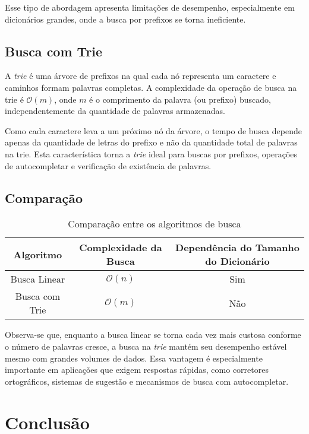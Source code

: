 \documentclass[12pt]{article}
\begin{document}
Esse tipo de abordagem apresenta limitações de desempenho, especialmente em dicionários grandes, onde a busca por prefixos se torna ineficiente.

\subsection{Busca com Trie}

A \textit{trie} é uma árvore de prefixos na qual cada nó representa um caractere e caminhos formam palavras completas. A complexidade da operação de busca na trie é $\mathcal{O}(m)$, onde $m$ é o comprimento da palavra (ou prefixo) buscado, independentemente da quantidade de palavras armazenadas.

Como cada caractere leva a um próximo nó da árvore, o tempo de busca depende apenas da quantidade de letras do prefixo e não da quantidade total de palavras na trie. Esta característica torna a \textit{trie} ideal para buscas por prefixos, operações de autocompletar e verificação de existência de palavras.

\subsection{Comparação}

\begin{table}[H]
\centering
\caption{Comparação entre os algoritmos de busca}
\begin{tabular}{|c|c|c|}
\hline
\textbf{Algoritmo} & \textbf{Complexidade da Busca} & \textbf{Dependência do Tamanho do Dicionário} \\
\hline
Busca Linear       & $\mathcal{O}(n)$              & Sim \\
\hline
Busca com Trie     & $\mathcal{O}(m)$              & Não \\
\hline
\end{tabular}
\end{table}

Observa-se que, enquanto a busca linear se torna cada vez mais custosa conforme o número de palavras cresce, a busca na \textit{trie} mantém seu desempenho estável mesmo com grandes volumes de dados. Essa vantagem é especialmente importante em aplicações que exigem respostas rápidas, como corretores ortográficos, sistemas de sugestão e mecanismos de busca com autocompletar.

\section{Conclusão}
\end{document}
